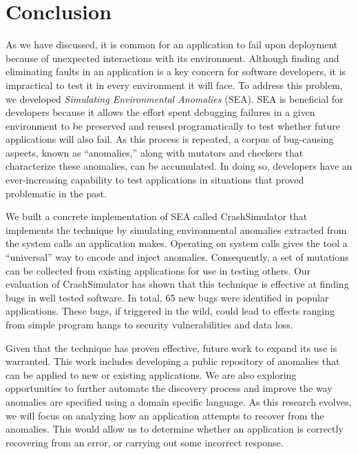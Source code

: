 \section{Conclusion}
\label{SEC:conclusion}

As we have discussed,
it is common for an application
to fail upon deployment because of unexpected interactions
with its environment.
Although finding and eliminating
faults in an application is a key concern for software developers, it is
impractical to test it in every environment it will face.
To address this problem, we developed \textit{Simulating Environmental
Anomalies} (SEA).
SEA is beneficial for developers because it allows
the effort spent debugging failures in a given environment
to be preserved and reused programatically to test whether
future applications will also fail.
As this process is repeated,
a corpus of bug-causing aspects,
known as ``anomalies,''
along with mutators and checkers that characterize these anomalies,
can be accumulated. In doing so, developers have an ever-increasing capability
to test applications in situations
that proved problematic in the past.

We built a concrete implementation of SEA
called CrashSimulator that implements
the technique by simulating environmental
anomalies extracted from the system calls an application makes.
Operating on system calls gives the tool a ``universal'' way to
encode and inject anomalies. Consequently, a set of mutations can be
collected from existing applications for use in testing others.
Our evaluation of CrashSimulator
has shown that this technique is
effective at finding bugs in well tested software.
In total,
65 new bugs were identified in popular applications.
These bugs, if triggered in the wild,
could lead to effects ranging from simple program hangs
to security vulnerabilities and data loss.

Given that the technique has
proven effective, future work to expand its use is warranted. This work includes
developing a public repository of anomalies
that can be applied to new or existing applications.
We are also exploring
opportunities to further automate the discovery process
and improve the way anomalies are specified using a
domain specific language.
As this research evolves, we will focus on analyzing how an
application attempts
to recover from the anomalies.  This would allow
us to determine whether
an application is correctly recovering
from an error, or carrying out some incorrect response.
